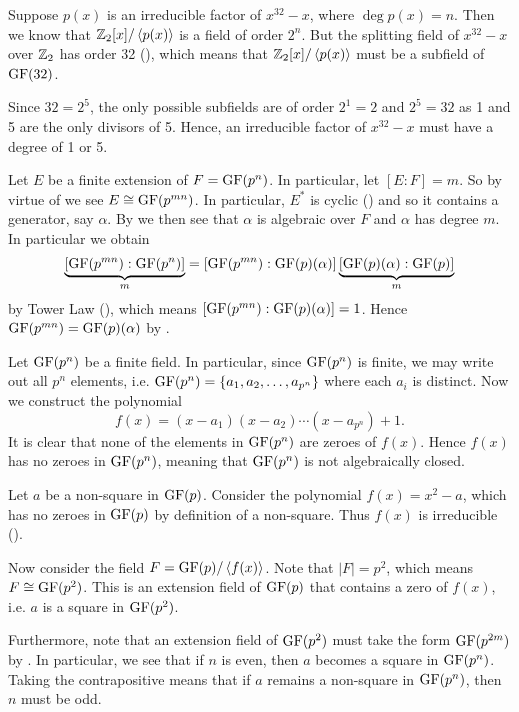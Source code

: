 \begin{questions}
    \item Suppose $p(x)$ is an irreducible factor of $x^{32} - x$, where $\deg p(x) = n$. Then we know that $\mathbb{Z}_2[x]/\left\langle p(x)\right\rangle$ is a field of order $2^n$. But the splitting field of $x^{32} - x$ over $\mathbb{Z}_2$ has order 32 (), which means that $\mathbb{Z}_2[x]/\left\langle p(x)\right\rangle$ must be a subfield of $\mathrm{GF}(32)$.

    Since $32 = 2^5$, the only possible subfields are of order $2^1 = 2$ and $2^5 = 32$ as 1 and 5 are the only divisors of 5. Hence, an irreducible factor of $x^{32} - x$ must have a degree of 1 or 5.

    \item Let $E$ be a finite extension of $F = \mathrm{GF}(p^n)$. In particular, let $[E:F] = m$. So by virtue of  we see $E \cong \mathrm{GF}(p^{mn})$. In particular, $E^\ast$ is cyclic () and so it contains a generator, say $\alpha$. By  we then see that $\alpha$ is algebraic over $F$ and $\alpha$ has degree $m$. In particular we obtain
    \[
        \underbrace{[\mathrm{GF}(p^{mn}):\mathrm{GF}(p^n)]}_m = [\mathrm{GF}(p^{mn}):\mathrm{GF}(p)(\alpha)]\underbrace{[\mathrm{GF}(p)(\alpha):\mathrm{GF}(p)]}_{m}
    \]
    by Tower Law (), which means $[\mathrm{GF}(p^{mn}):\mathrm{GF}(p)(\alpha)] = 1$. Hence $\mathrm{GF}(p^{mn}) = \mathrm{GF}(p)(\alpha)$ by .

    \item Let $\mathrm{GF}(p^n)$ be a finite field. In particular, since $\mathrm{GF}(p^n)$ is finite, we may write out all $p^n$ elements, i.e. $\mathrm{GF}(p^n) = \{a_1, a_2, \dots, a_{p^n}\}$ where each $a_i$ is distinct. Now we construct the polynomial
    \[
        f(x) = (x-a_1)(x-a_2)\cdots(x-a_{p^n}) + 1.
    \]
    It is clear that none of the elements in $\mathrm{GF}(p^n)$ are zeroes of $f(x)$. Hence $f(x)$ has no zeroes in $\mathrm{GF}(p^n)$, meaning that $\mathrm{GF}(p^n)$ is not algebraically closed.

    \item Let $a$ be a non-square in $\mathrm{GF}(p)$. Consider the polynomial $f(x) = x^2 - a$, which has no zeroes in $\mathrm{GF}(p)$ by definition of a non-square. Thus $f(x)$ is irreducible ().

    Now consider the field $F = \mathrm{GF}(p)/\left\langle f(x)\right\rangle$. Note that $|F| = p^2$, which means $F \cong \mathrm{GF}(p^2)$. This is an extension field of $\mathrm{GF}(p)$ that contains a zero of $f(x)$, i.e. $a$ is a square in $\mathrm{GF}(p^2)$.

    Furthermore, note that an extension field of $\mathrm{GF}(p^2)$ must take the form $\mathrm{GF}(p^{2m})$ by . In particular, we see that if $n$ is even, then $a$ becomes a square in $\mathrm{GF}(p^n)$. Taking the contrapositive means that if $a$ remains a non-square in $\mathrm{GF}(p^n)$, then $n$ must be odd.
\end{questions}

